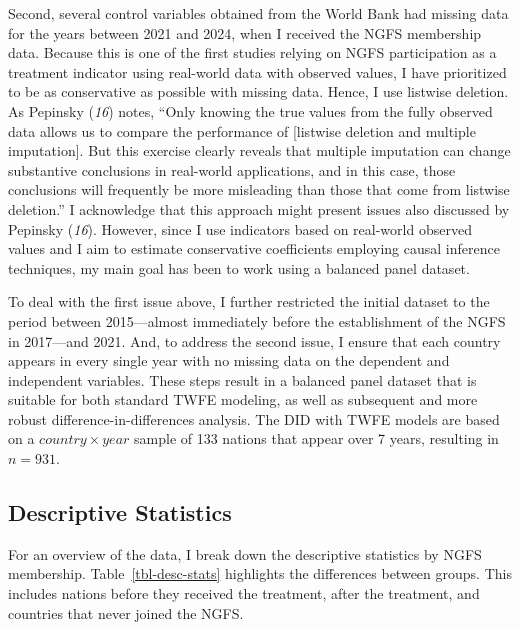 \documentclass[
  12pt,
  letterpaper,
]{article}
\begin{document}
Second, several control variables obtained from the World Bank had
missing data for the years between 2021 and 2024, when I received the
NGFS membership data. Because this is one of the first studies relying
on NGFS participation as a treatment indicator using real-world data
with observed values, I have prioritized to be as conservative as
possible with missing data. Hence, I use listwise deletion. As Pepinsky
(\emph{16}) notes, ``Only knowing the true values from the fully
observed data allows us to compare the performance of {[}listwise
deletion and multiple imputation{]}. But this exercise clearly reveals
that multiple imputation can change substantive conclusions in
real-world applications, and in this case, those conclusions will
frequently be more misleading than those that come from listwise
deletion.'' I acknowledge that this approach might present issues also
discussed by Pepinsky (\emph{16}). However, since I use indicators based
on real-world observed values and I aim to estimate conservative
coefficients employing causal inference techniques, my main goal has
been to work using a balanced panel dataset.

To deal with the first issue above, I further restricted the initial
dataset to the period between 2015---almost immediately before the
establishment of the NGFS in 2017---and 2021. And, to address the second
issue, I ensure that each country appears in every single year with no
missing data on the dependent and independent variables. These steps
result in a balanced panel dataset that is suitable for both standard
TWFE modeling, as well as subsequent and more robust
difference-in-differences analysis. The DID with TWFE models are based
on a \(country \times year\) sample of 133 nations that appear over 7
years, resulting in \(n = 931\).

\subsection{Descriptive Statistics}\label{descriptive-statistics}

For an overview of the data, I break down the descriptive statistics by
NGFS membership. Table~\ref{tbl-desc-stats} highlights the differences
between groups. This includes nations before they received the
treatment, after the treatment, and countries that never joined the
NGFS.
\end{document}
